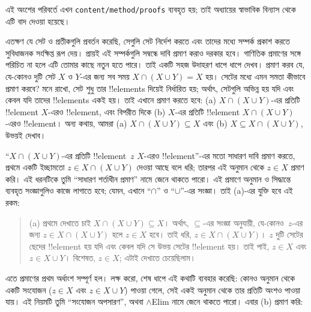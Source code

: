\documentclass[../../../include/open-logic-section]{subfiles}
\begin{document}

\begin{editorial}
এই অংশের পরিবর্তে এখন \verb|content/method/proofs| ব্যবহৃত হয়;
তাই অধ্যায়ের স্বাভাবিক বিন্যাস থেকে এটি বাদ দেওয়া হয়েছে।
\end{editorial}

\begin{explain}
এতক্ষণ যে সেট ও প্রতীকগুলি প্রবর্তন করেছি, সেগুলি সেট নির্দেশ করতে
এবং তাদের মধ্যে সম্পর্ক প্রকাশ করতে সুবিধাজনক সংক্ষিপ্ত রূপ দেয়।
প্রায়ই এই সম্পর্কগুলি সম্বন্ধে দাবি প্রমাণ করাও দরকার হবে। গাণিতিক
প্রমাণের সঙ্গে পরিচিত না হলে এটি তোমার কাছে নতুন হতে পারে। তাই
একটি সহজ উদাহরণ ধাপে ধাপে দেখব। প্রমাণ করব যে, যে-কোনও দুটি
সেট $X$ ও $Y$-এর জন্য সব সময় $X \cap (X \cup Y) = X$ হয়।
সেটের মধ্যে এমন সমতা কীভাবে প্রমাণ করবে? মনে রাখো, সেট শুধু তার
!!{element}s দিয়েই নির্ধারিত হয়; অর্থাৎ, সেটগুলি অভিন্ন হয় যদি এবং
কেবল যদি তাদের !!{element}s একই হয়। তাই এখানে প্রমাণ করতে হবে:
(a) $X \cap (X \cup Y)$-এর প্রতিটি !!{element} $X$-এরও !!{element},
এবং বিপরীত দিকে (b) $X$-এর প্রতিটি !!{element}
$X \cap (X \cup Y)$-এরও !!{element}। অন্য কথায়, আমরা
(a) $X \cap (X \cup Y) \subseteq X$ এবং
(b) $X \subseteq X \cap (X \cup Y)$, উভয়ই দেখাব।

``$X \cap (X \cup Y)$-এর প্রতিটি !!{element}~$z$ $X$-এরও
!!{element}''-এর মতো সাধারণ দাবি প্রমাণ করতে, প্রথমে একটি ইচ্ছামতো
$z \in X \cap (X \cup Y)$ দেওয়া আছে বলে ধরি; তারপর এই অনুমান থেকে
$z \in X$ প্রমাণ করি। এই ধরনটিকে তুমি ``সাধারণ শর্তাধীন প্রমাণ''
নামে জেনে থাকতে পারো। এই প্রমাণে অনুমান ও সিদ্ধান্তে ব্যবহৃত
সংজ্ঞাগুলিও কাজে লাগাতে হবে; যেমন, এখানে ``$\cap$'' ও ``$\cup$''-এর
সংজ্ঞা। তাই (a)-এর যুক্তি হবে এই রকম:

\begin{quote}
(a) প্রথমে দেখাতে চাই $X \cap (X \cup Y) \subseteq X$।
অর্থাৎ, $\subseteq$-এর সংজ্ঞা অনুযায়ী, যে-কোনও~$z$-এর জন্য
$z \in X \cap (X \cup Y)$ হলে $z \in X$ হবে। তাই ধরি,
$z \in X \cap (X \cup Y)$। $z$ দুটি সেটের ছেদের !!{element}
হয় যদি এবং কেবল যদি সে উভয় সেটের !!{element} হয়। তাই পাই,
$z \in X$ এবং $z \in X \cup Y$। বিশেষত, $z \in X$;
এটাই দেখাতে চেয়েছিলাম।
\end{quote}

এতে প্রমাণের প্রথম অর্ধাংশ সম্পূর্ণ হল। লক্ষ করো, শেষ ধাপে এই কথাটি
ব্যবহার করেছি: কোনও অনুমান থেকে একটি সংযোজন ($z \in X$ এবং
$z \in X \cup Y$) পাওয়া গেলে, সেই একই অনুমান থেকে তার প্রতিটি
অংশও পাওয়া যায়। এই নিয়মটি তুমি ``সংযোজন অপসারণ'', অথবা
$\land$Elim নামে জেনে থাকতে পারো। এবার (b) প্রমাণ করি:


\end{explain}
\end{document}
